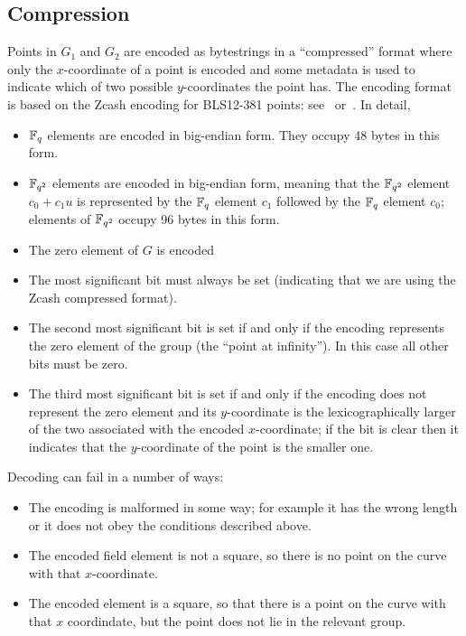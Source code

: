 \subsection{Compression}
Points in $G_1$ and $G_2$ are encoded as bytestrings in a ``compressed'' format
where only the $x$-coordinate of a point is encoded and some metadata is used to
indicate which of two possible $y$-coordinates the point has.  The encoding
format is based on the Zcash encoding for BLS12-381 points:
see~\cite{Zcash-serialisation} or~\cite[``Serialization'']{blst-library}.  In
detail,
\begin{itemize}

\item $\mathbb{F}_q$ elements are encoded in big-endian form. They occupy 48 bytes in this form.
\item $\mathbb{F}_{q^2}$ elements are encoded in big-endian form, meaning that the $\mathbb{F}_{q^2}$ element $c_0 + c_1u$
  is represented by the $\mathbb{F}_q$ element $c_1$ followed by the $\mathbb{F}_q$ element $c_0$; elements of $\mathbb{F}_{q^2}$
  occupy 96 bytes in this form.
\item The zero element of $G$ is encoded
\item The most significant bit must always be set (indicating that we are using the Zcash compressed format).
\item The second most significant bit is set if and only if the encoding represents the zero
element of the group (the ``point at infinity'').  In this case all other bits
must be zero.
\item The third most significant bit is set if and only if the encoding does not represent the zero
element and its $y$-coordinate is the lexicographically larger of the two
associated with the encoded $x$-coordinate; if the bit is clear then it
indicates that the $y$-coordinate of the point is the smaller one.
\end{itemize}

Decoding can fail in a number of ways:
\begin{itemize}
\item The encoding is malformed in some way; for example it has the wrong length or it does
not obey the conditions described above.
\item The encoded field element is not a square, so there is no point on the curve with that $x$-coordinate.
\item The encoded element is a square,  so that there is a point on the curve with that $x$ coordindate,
but the point does not lie in the relevant group.
\end{itemize}

